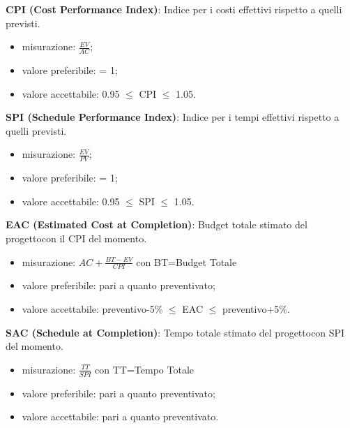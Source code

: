 				\textbf{CPI (Cost Performance Index)}: Indice per i costi effettivi rispetto a quelli previsti.
				\begin{itemize}
					\item misurazione: $\frac{EV}{AC}$;
					\item valore preferibile: = 1;
					\item valore accettabile: 0.95 $\le$ CPI $\le$ 1.05.
				\end{itemize}
				\textbf{SPI (Schedule Performance Index)}: Indice per i tempi effettivi rispetto a quelli previsti.
				\begin{itemize}
					\item misurazione: $\frac{EV}{PV}$;
					\item valore preferibile: = 1;
					\item valore accettabile: 0.95 $\le$ SPI $\le$ 1.05.
				\end{itemize}
				\textbf{EAC (Estimated Cost at Completion)}: Budget totale stimato del progetto\glosp con il CPI del momento.
				\begin{itemize}
					\item misurazione: $AC+ \frac{BT-EV}{CPI}$ con BT=Budget Totale
					\item valore preferibile: pari a quanto preventivato;
					\item valore accettabile: preventivo-5\% $\le$ EAC $\le$ preventivo+5\%.
				\end{itemize}
				\textbf{SAC (Schedule at Completion)}: Tempo totale stimato del progetto\glosp con SPI del momento.
				\begin{itemize}
					\item misurazione: $\frac{TT}{SPI}$ con TT=Tempo Totale
					\item valore preferibile: pari a quanto preventivato;
					\item valore accettabile: pari a quanto preventivato.
				\end{itemize}
				
